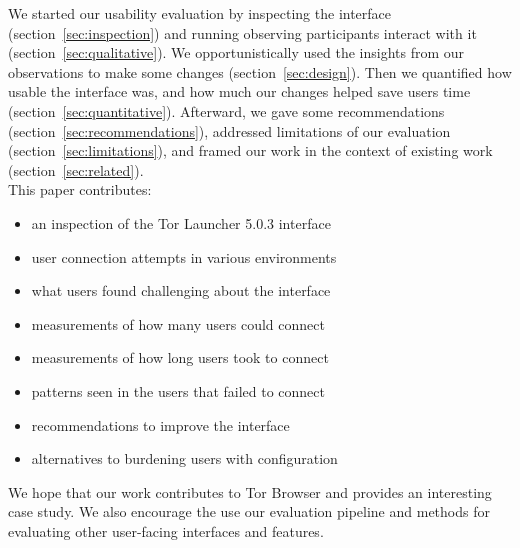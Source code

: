 \documentclass[USenglish,oneside,twocolumn]{article}
\begin{document}
We started our usability evaluation by inspecting the interface (section~\ref{sec:inspection}) and
running observing participants interact with it (section~\ref{sec:qualitative}). 
We opportunistically used the insights from our observations to make some changes (section~\ref{sec:design}).
Then we quantified how usable the interface was, and 
how much our changes helped save users time (section~\ref{sec:quantitative}).
Afterward, we gave some recommendations (section~\ref{sec:recommendations}), addressed
limitations of our evaluation (section~\ref{sec:limitations}), and framed our work in the context of existing work (section~\ref{sec:related}). \\

\noindent This paper contributes:
\smallskip
\begin{itemize}
\item an inspection of the Tor Launcher 5.0.3 interface
\item user connection attempts in various environments
\item what users found challenging about the interface
\item measurements of how many users could connect
\item measurements of how long users took to connect
\item patterns seen in the users that failed to connect
\item recommendations to improve the interface
\item alternatives to burdening users with configuration 
\end{itemize}

We hope that our work contributes to Tor Browser and provides an interesting case study. We also encourage the use our evaluation pipeline and methods for evaluating other user-facing interfaces and features.  
\end{document}

